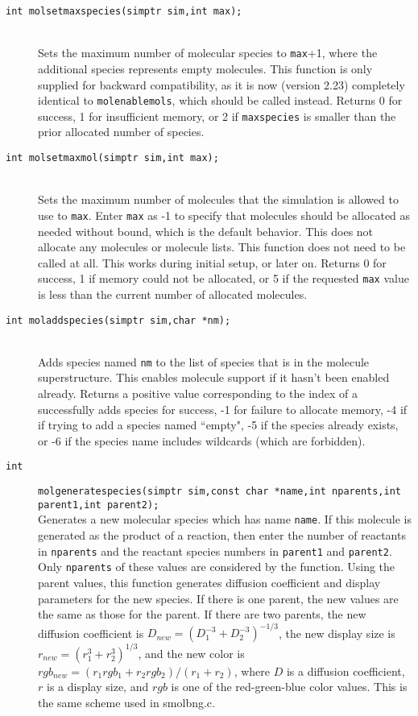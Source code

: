 \documentclass {scrbook}
\newcommand {\ttt} {\texttt}
\begin{document}
\begin{description}
\item[\ttt{int molsetmaxspecies(simptr sim,int max);}]
\hfill \\
Sets the maximum number of molecular species to \ttt{max}+1, where the additional species represents empty molecules. This function is only supplied for backward compatibility, as it is now (version 2.23) completely identical to \ttt{molenablemols}, which should be called instead. Returns 0 for success, 1 for insufficient memory, or 2 if \ttt{maxspecies} is smaller than the prior allocated number of species.

\item[\ttt{int molsetmaxmol(simptr sim,int max);}]
\hfill \\
Sets the maximum number of molecules that the simulation is allowed to use to \ttt{max}. Enter \ttt{max} as -1 to specify that molecules should be allocated as needed without bound, which is the default behavior. This does not allocate any molecules or molecule lists. This function does not need to be called at all. This works during initial setup, or later on. Returns 0 for success, 1 if memory could not be allocated, or 5 if the requested \ttt{max} value is less than the current number of allocated molecules.

\item[\ttt{int moladdspecies(simptr sim,char *nm);}]
\hfill \\
Adds species named \ttt{nm} to the list of species that is in the molecule superstructure. This enables molecule support if it hasn't been enabled already. Returns a positive value corresponding to the index of a successfully adds species for success, -1 for failure to allocate memory, -4 if if trying to add a species named ``empty", -5 if the species already exists, or -6 if the species name includes wildcards (which are forbidden).

\item[\ttt{int}]
\ttt{molgeneratespecies(simptr sim,const char *name,int nparents,int parent1,int parent2);} \\
Generates a new molecular species which has name \ttt{name}. If this molecule is generated as the product of a reaction, then enter the number of reactants in \ttt{nparents} and the reactant species numbers in \ttt{parent1} and \ttt{parent2}. Only \ttt{nparents} of these values are considered by the function. Using the parent values, this function generates diffusion coefficient and display parameters for the new species. If there is one parent, the new values are the same as those for the parent. If there are two parents, the new diffusion coefficient is $D_{new}=(D_1^{-3}+D_2^{-3})^{-1/3}$, the new display size is $r_{new}=(r_1^3+r_2^3)^{1/3}$, and the new color is $rgb_{new}=(r_1rgb_1+r_2rgb_2)/(r_1+r_2)$, where $D$ is a diffusion coefficient, $r$ is a display size, and $rgb$ is one of the red-green-blue color values. This is the same scheme used in smolbng.c.


\end{description}
\end{document}
